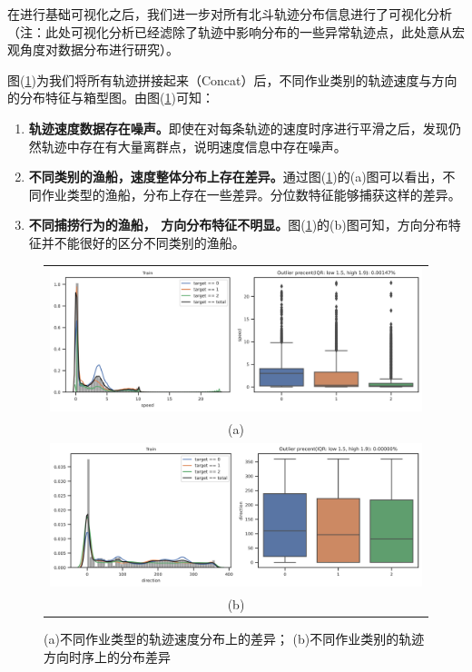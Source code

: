 \documentclass[UTF8, 12pt]{ctexart}
\begin{document}
	在进行基础可视化之后，我们进一步对所有北斗轨迹分布信息进行了可视化分析（注：此处可视化分析已经滤除了轨迹中影响分布的一些异常轨迹点，此处意从宏观角度对数据分布进行研究）。

	图(\ref{sec_1_fig_3})为我们将所有轨迹拼接起来（Concat）后，不同作业类别的轨迹速度与方向的分布特征与箱型图。由图(\ref{sec_1_fig_3})可知：
	\begin{enumerate}
		\item \textbf{轨迹速度数据存在噪声。}即使在对每条轨迹的速度时序进行平滑之后，发现仍然轨迹中存在有大量离群点，说明速度信息中存在噪声。
		\item \textbf{不同类别的渔船，速度整体分布上存在差异。}通过图(\ref{sec_1_fig_3})的(a)图可以看出，不同作业类型的渔船，分布上存在一些差异。分位数特征能够捕获这样的差异。
		\item \textbf{不同捕捞行为的渔船， 方向分布特征不明显。}图(\ref{sec_1_fig_3})的(b)图可知，方向分布特征并不能很好的区分不同类别的渔船。
	\end{enumerate}
	\begin{figure}[H]
		\centering
		\begin{tabular}{c}
			\includegraphics[width=0.65\linewidth]{..//plots//feature_speed_distribution.png} \\
			(a) \\
			\includegraphics[width=0.65\linewidth]{..//plots//feature_direction_distribution.png} \\
			(b)
		\end{tabular}
		\caption{(a)不同作业类型的轨迹速度分布上的差异； (b)不同作业类别的轨迹方向时序上的分布差异}
		\label{sec_1_fig_3}
		\vspace{-0.2cm}
	\end{figure}
\end{document}
